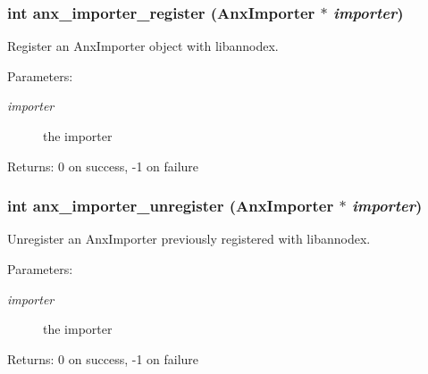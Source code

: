 \subsubsection{\setlength{\rightskip}{0pt plus 5cm}int anx\_\-importer\_\-register ({\bf Anx\-Importer} $\ast$ {\em importer})}\label{anx__import_8h_a8}


Register an Anx\-Importer object with libannodex. 

\begin{Desc}
\item[Parameters:]
\begin{description}
\item[{\em importer}]the importer \end{description}
\end{Desc}
\begin{Desc}
\item[Returns:]0 on success, -1 on failure \end{Desc}
\subsubsection{\setlength{\rightskip}{0pt plus 5cm}int anx\_\-importer\_\-unregister ({\bf Anx\-Importer} $\ast$ {\em importer})}\label{anx__import_8h_a9}


Unregister an Anx\-Importer previously registered with libannodex. 

\begin{Desc}
\item[Parameters:]
\begin{description}
\item[{\em importer}]the importer \end{description}
\end{Desc}
\begin{Desc}
\item[Returns:]0 on success, -1 on failure \end{Desc}
